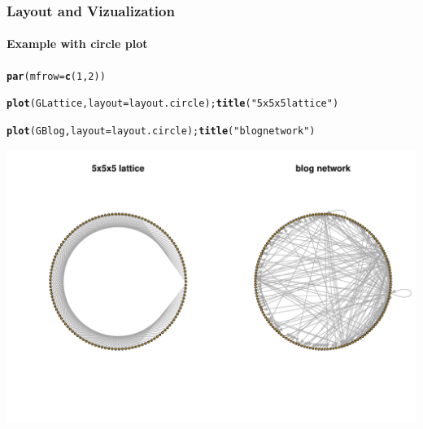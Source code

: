 \documentclass{beamer}\usepackage[]{graphicx}\usepackage[]{color}
\makeatletter
\newcommand{\hlnum}[1]{\textcolor[rgb]{0.686,0.059,0.569}{#1}}%
\newcommand{\hlstr}[1]{\textcolor[rgb]{0.192,0.494,0.8}{#1}}%
\newcommand{\hlstd}[1]{\textcolor[rgb]{0.345,0.345,0.345}{#1}}%
\newcommand{\hlkwc}[1]{\textcolor[rgb]{0.333,0.667,0.333}{#1}}%
\newcommand{\hlkwd}[1]{\textcolor[rgb]{0.737,0.353,0.396}{\textbf{#1}}}%
\newenvironment{kframe}{%
 \def\at@end@of@kframe{}%
 \ifinner\ifhmode%
  \def\at@end@of@kframe{\end{minipage}}%
  \begin{minipage}{\columnwidth}%
 \fi\fi%
 \def\FrameCommand##1{\hskip\@totalleftmargin \hskip-\fboxsep
 \colorbox{shadecolor}{##1}\hskip-\fboxsep
     \hskip-\linewidth \hskip-\@totalleftmargin \hskip\columnwidth}%
 \MakeFramed {\advance\hsize-\width
   \@totalleftmargin\z@ \linewidth\hsize
   \@setminipage}}%
 {\par\unskip\endMakeFramed%
 \at@end@of@kframe}
\newenvironment{knitrout}{}{} %
\makeatother
\begin{document}
\begin{frame}
  \frametitle{Layout and Vizualization}
  \framesubtitle{Example with circle plot}
  


\begin{knitrout}\scriptsize
{}\color{fgcolor}\begin{kframe}
\begin{alltt}
\hlkwd{par}\hlstd{(}\hlkwc{mfrow}\hlstd{=}\hlkwd{c}\hlstd{(}\hlnum{1}\hlstd{,}\hlnum{2}\hlstd{))}

\hlkwd{plot}\hlstd{(GLattice,} \hlkwc{layout}\hlstd{=layout.circle);} \hlkwd{title}\hlstd{(}\hlstr{"5x5x5 lattice"}\hlstd{)}

\hlkwd{plot}\hlstd{(GBlog   ,} \hlkwc{layout}\hlstd{=layout.circle);} \hlkwd{title}\hlstd{(}\hlstr{"blog network"}\hlstd{)}
\end{alltt}
\end{kframe}
\includegraphics[width=.8\textwidth]{figures/vizu_3-1} 

\end{knitrout}
  
\end{frame}
\end{document}
